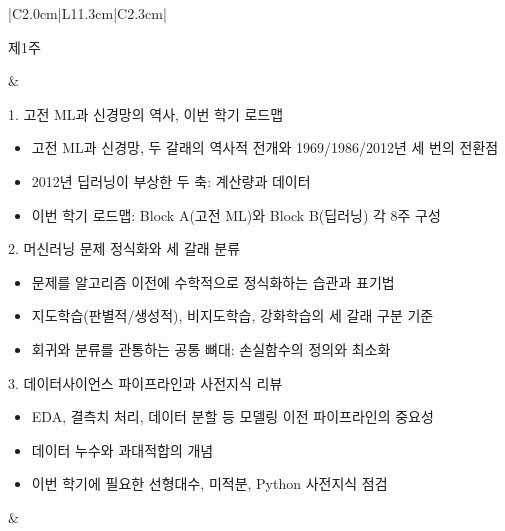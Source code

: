 \documentclass[11pt,a4paper]{article}
\begin{document}
\begin{longtable}{|C{2.0cm}|L{11.3cm}|C{2.3cm}|}
\begin{minipage}[t]{1.8cm}\centering 제1주\\[2mm]\hspace*{0mm}\end{minipage} & \begin{minipage}[t]{11.0cm}
1. 고전 ML과 신경망의 역사, 이번 학기 로드맵\\
\vspace{-1mm}\begin{itemize}[leftmargin=5mm,itemsep=0.2mm,topsep=0.5mm,parsep=0pt]
\item\small 고전 ML과 신경망, 두 갈래의 역사적 전개와 1969/1986/2012년 세 번의 전환점
\item\small 2012년 딥러닝이 부상한 두 축: 계산량과 데이터
\item\small 이번 학기 로드맵: Block A(고전 ML)와 Block B(딥러닝) 각 8주 구성
\end{itemize}
\vspace{1mm}
2. 머신러닝 문제 정식화와 세 갈래 분류\\
\vspace{-1mm}\begin{itemize}[leftmargin=5mm,itemsep=0.2mm,topsep=0.5mm,parsep=0pt]
\item\small 문제를 알고리즘 이전에 수학적으로 정식화하는 습관과 표기법
\item\small 지도학습(판별적/생성적), 비지도학습, 강화학습의 세 갈래 구분 기준
\item\small 회귀와 분류를 관통하는 공통 뼈대: 손실함수의 정의와 최소화
\end{itemize}
\vspace{1mm}
3. 데이터사이언스 파이프라인과 사전지식 리뷰\\
\vspace{-1mm}\begin{itemize}[leftmargin=5mm,itemsep=0.2mm,topsep=0.5mm,parsep=0pt]
\item\small EDA, 결측치 처리, 데이터 분할 등 모델링 이전 파이프라인의 중요성
\item\small 데이터 누수와 과대적합의 개념
\item\small 이번 학기에 필요한 선형대수, 미적분, Python 사전지식 점검
\end{itemize}
\vspace{1mm}
\end{minipage} & \begin{minipage}[t]{2.1cm}\centering \end{minipage} \\


\end{longtable}
\end{document}
